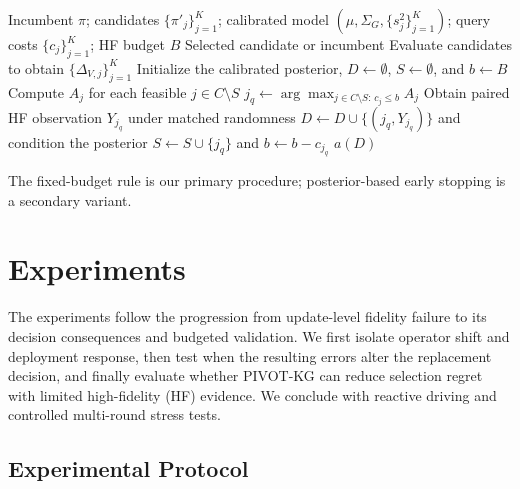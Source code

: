 \documentclass{article}
\begin{document}
\begin{algorithm}[H]
\caption{PIVOT-KG under a fixed high-fidelity budget (single-round procedure;
v3c uses this logic inside a controlled five-round extension).}
\label{alg:pivot-kg}
\begin{algorithmic}[1]
\REQUIRE Incumbent $\pi$; candidates $\{\pi'_j\}_{j=1}^K$;
calibrated model $(\mu,\Sigma_G,\{s_j^2\}_{j=1}^K)$;
query costs $\{c_j\}_{j=1}^K$; HF budget $B$
\ENSURE Selected candidate or incumbent
\STATE Evaluate candidates to obtain $\{\Delta_{V,j}\}_{j=1}^K$
\STATE Initialize the calibrated posterior,
$D\leftarrow\emptyset$, $S\leftarrow\emptyset$, and $b\leftarrow B$
  \STATE Compute $A_j$ for each feasible $j\in C\setminus S$
  \STATE
  $j_q\leftarrow
  \arg\max_{j\in C\setminus S:\,c_j\leq b} A_j$
  \STATE Obtain paired HF observation $Y_{j_q}$ under matched randomness
  \STATE $D\leftarrow D\cup\{(j_q,Y_{j_q})\}$ and condition the posterior
  \STATE $S\leftarrow S\cup\{j_q\}$ and $b\leftarrow b-c_{j_q}$
\ENDWHILE
\RETURN $a(D)$
\end{algorithmic}
\end{algorithm}

The fixed-budget rule is our primary procedure; posterior-based early stopping
is a secondary variant.


\section{Experiments}

The experiments follow the progression from update-level fidelity failure to
its decision consequences and budgeted validation. We first isolate operator
shift and deployment response, then test when the resulting errors alter the
replacement decision, and finally evaluate whether PIVOT-KG can reduce
selection regret with limited high-fidelity (HF) evidence. We conclude with
reactive driving and controlled multi-round stress tests.

\subsection{Experimental Protocol}
\label{sec:exp-protocol}
\end{document}
